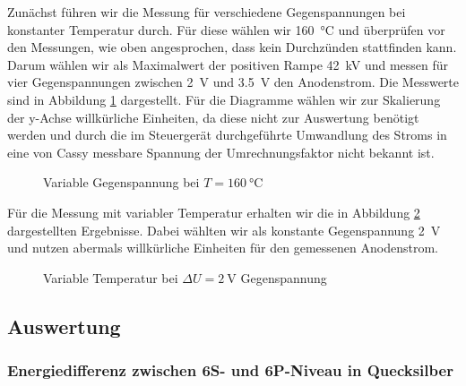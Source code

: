 \documentclass[11pt, a4paper]{article}
\begin{document}
Zunächst führen wir die Messung für verschiedene Gegenspannungen bei konstanter Temperatur durch.
Für diese wählen wir \SI{160}{\degreeCelsius} und überprüfen vor den Messungen, wie oben angesprochen, dass kein Durchzünden stattfinden kann.
Darum wählen wir als Maximalwert der positiven Rampe \SI{42}{\kilo\volt} und messen für vier Gegenspannungen zwischen \SI{2}{\volt} und \SI{3.5}{\volt} den Anodenstrom.
Die Messwerte sind in Abbildung \ref{fig:fh_varvolt} dargestellt.
Für die Diagramme wählen wir zur Skalierung der y-Achse willkürliche Einheiten, da diese nicht zur Auswertung benötigt werden und durch die im Steuergerät durchgeführte Umwandlung des Stroms in eine von Cassy messbare Spannung der Umrechnungsfaktor nicht bekannt ist.
\begin{figure}[!h]
\centering

\caption{Variable Gegenspannung bei $T=\SI{160}{\degreeCelsius}$}
\label{fig:fh_varvolt}
\end{figure}
Für die Messung mit variabler Temperatur erhalten wir die in Abbildung \ref{fig:fh_vartemp} dargestellten Ergebnisse.
Dabei wählten wir als konstante Gegenspannung \SI{2}{\volt} und nutzen abermals willkürliche Einheiten für den gemessenen Anodenstrom.
\begin{figure}[!h]
\centering

\caption{Variable Temperatur bei $\Delta U=\SI{2}{\volt}$ Gegenspannung}
\label{fig:fh_vartemp}
\end{figure}

\subsection{Auswertung}

\subsubsection{Energiedifferenz zwischen 6S- und 6P-Niveau in Quecksilber}
\end{document}

